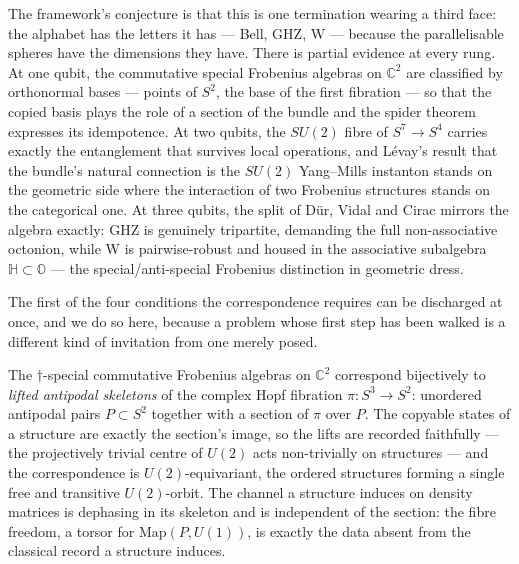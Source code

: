 The framework's conjecture is that this is one termination wearing a third face: the alphabet
has the letters it has --- Bell, GHZ, W --- because the parallelisable spheres have the
dimensions they have. There is partial evidence at every rung. At one qubit, the commutative
special Frobenius algebras on $\mathbb{C}^{2}$ are classified by orthonormal bases --- points of
$S^{2}$, the base of the first fibration --- so that the copied basis plays the role of a
section of the bundle and the spider theorem expresses its idempotence. At two qubits, the
$SU(2)$ fibre of $S^{7} \to S^{4}$ carries exactly the entanglement that survives local
operations, and L\'{e}vay's result that the bundle's natural connection is the $SU(2)$
Yang--Mills instanton \autocite{levay2004geometry} stands on the geometric side where the
interaction of two Frobenius structures stands on the categorical one. At three qubits, the
split of D\"{u}r, Vidal and Cirac \autocite{durvidalcirac2000three} mirrors the algebra exactly:
GHZ is genuinely tripartite, demanding the full non-associative octonion, while W is
pairwise-robust and housed in the associative subalgebra $\mathbb{H} \subset \mathbb{O}$ --- the
special/anti-special Frobenius distinction in geometric dress.

The first of the four conditions the correspondence requires can be discharged at once, and we
do so here, because a problem whose first step has been walked is a different kind of invitation
from one merely posed.

\begin{proposition}\label{prop:f1-dictionary} The $\dagger$-special
commutative Frobenius algebras on $\mathbb{C}^{2}$ correspond bijectively to
\emph{lifted antipodal skeletons} of the complex Hopf fibration $\pi \colon S^{3} \to S^{2}$:
unordered antipodal pairs $P \subset S^{2}$ together with a section of $\pi$ over $P$. The
copyable states of a structure are exactly the section's image, so the lifts are recorded
faithfully --- the projectively trivial centre of $U(2)$ acts non-trivially on structures ---
and the correspondence is $U(2)$-equivariant, the ordered structures forming a single free and
transitive $U(2)$-orbit. The channel a structure induces on density matrices is dephasing in its
skeleton and is independent of the section: the fibre freedom, a torsor for
$\mathrm{Map}(P, U(1))$, is exactly the data absent from the classical record a structure
induces.
\end{proposition}

